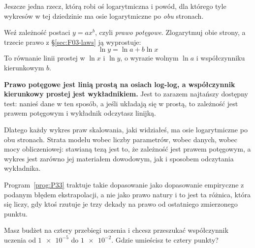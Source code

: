 
\begin{fr}
Jeszcze jedna rzecz, którą robi oś logarytmiczna \dash{} i powód, dla którego
tyle wykresów w tej dziedzinie ma osie logarytmiczne po \emph{obu} stronach.

Weź zależność postaci $y = a x^{b}$, czyli \emph{prawo potęgowe}. Zlogarytmuj
obie strony, a trzecie prawo z \S\ref{sec:F03-laws} ją wyprostuje:
\[ \ln y = \ln a + b \ln x \]
To równanie linii prostej w $\ln x$ i $\ln y$, o wyrazie wolnym $\ln a$ i
współczynniku kierunkowym $b$.

\textbf{Prawo potęgowe jest linią prostą na osiach log-log, a współczynnik
kierunkowy prostej jest wykładnikiem.} Jest to zarazem najtańszy dostępny test:
nanieś dane w ten sposób, a jeśli układają się w prostą, to zależność jest
prawem potęgowym i wykładnik odczytasz linijką.

\begin{aibox}
Dlatego każdy wykres praw skalowania, jaki widziałeś, ma osie logarytmiczne po
obu stronach. Strata modelu wobec liczby parametrów, wobec danych, wobec mocy
obliczeniowej: stawianą tezą jest to, że zależność jest prawem potęgowym, a
wykres jest zarówno jej materiałem dowodowym, jak i sposobem odczytania
wykładnika.

Program~\ref{prog:P33} traktuje takie dopasowanie jako dopasowanie empiryczne z
podanym błędem ekstrapolacji, a nie jako prawo natury \dash{} i to jest ta
różnica, która się liczy, gdy ktoś rzutuje je trzy dekady na prawo od
ostatniego zmierzonego punktu.
\end{aibox}

Masz budżet na cztery przebiegi uczenia i chcesz przeszukać współczynnik
uczenia od $\num{1e-5}$ do $\num{1e-2}$. Gdzie umieścisz te cztery punkty?
\nextframe
\end{fr}

